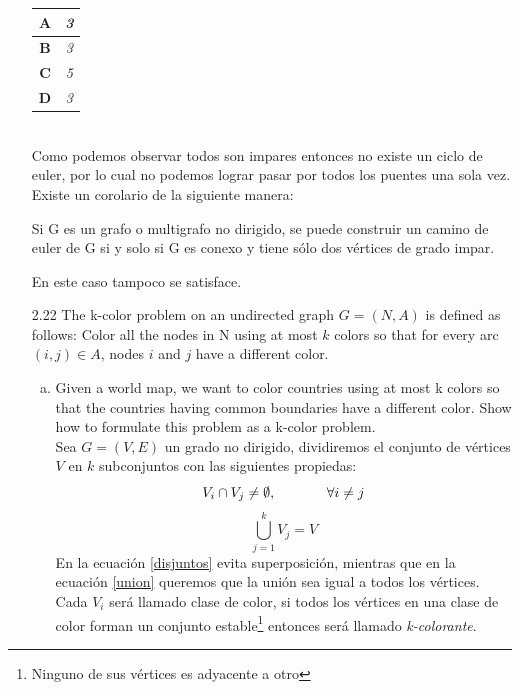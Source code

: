 \documentclass{report}
\begin{document}
\begin{enumerate}[2.1]
\begin{table}[ht]
\begin{tabular}{|c|c|}
        \textbf{A}       & \textit{3}     \\ \hline
        \textbf{B}       & \textit{3}     \\ \hline
        \textbf{C}       & \textit{5}     \\ \hline
        \textbf{D}       & \textit{3}              \\ \hline
        \end{tabular}
    \end{table}
    \\ Como podemos observar todos son impares entonces no existe un ciclo de euler, por lo cual no podemos lograr pasar por todos los puentes una sola vez.
    \\ Existe un corolario de la siguiente manera:
    \begin{tcolorbox}[colback=black!5!white,colframe=black!80!white,title=Corolario 1:]
        Si G es un grafo o multigrafo no dirigido, se puede construir un camino de euler de G si y solo si G es conexo y tiene sólo dos vértices de grado impar.
    \end{tcolorbox}
    En este caso tampoco se satisface. %
    \item[2.22] The k-color problem on an undirected graph $G = (N, A)$ is defined as follows: Color
    all the nodes in N using at most $k$ colors so that for every arc $(i, j) \in A$, nodes $i$ and
    $j$ have a different color.
    \begin{enumerate}[(a)]
        \item Given a world map, we want to color countries using at most k colors so that the
        countries having common boundaries have a different color. Show how to formulate
        this problem as a k-color problem.
        \\ Sea $G = (V,E)$ un grado no dirigido, dividiremos el conjunto de vértices $V$ en $k$ subconjuntos con las siguientes propiedas:
        \begin{equation} \label{disjuntos}
            V_i \cap V_j \neq \emptyset, \hspace{0.5 in } \forall i \neq j  
        \end{equation}
        \begin{equation} \label{union}
            \bigcup_{j=1}^ {k} V_j = V
        \end{equation}
        En la ecuación \ref{disjuntos} evita superposición, mientras que en la ecuación \ref{union} queremos que la unión sea igual a todos los vértices.
        \\ Cada $V_i$ será llamado clase de color, si todos los vértices en una clase de color forman un conjunto estable\footnote{Ninguno de sus vértices es adyacente a otro} entonces será llamado \textit{k-colorante}. \\

\end{enumerate}
\end{enumerate}
\end{document}
